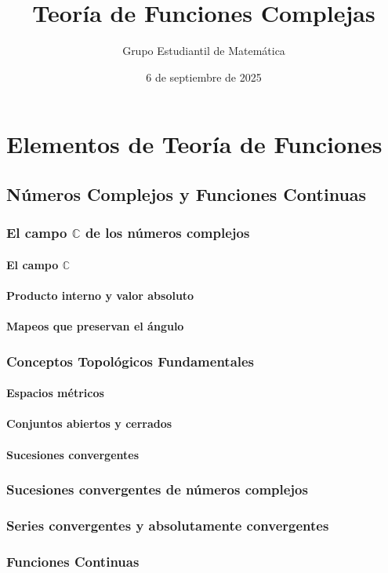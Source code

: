 \documentclass{report}
\title{Teoría de Funciones Complejas}
\author{Grupo Estudiantil de Matemática}
\date{6 de septiembre de 2025}
\begin{document}
\part{Elementos de Teoría de Funciones}
\chapter{Números Complejos y Funciones Continuas}
\section{El campo $\mathbb{C}$ de los números complejos}
\subsection{El campo $\mathbb{C}$}
\subsection{Producto interno y valor absoluto}
\subsection{Mapeos que preservan el ángulo}
\section{Conceptos Topológicos Fundamentales}
\subsection{Espacios métricos}
\subsection{Conjuntos abiertos y cerrados}
\subsection{Sucesiones convergentes}
\section{Sucesiones convergentes de números complejos}
\section{Series convergentes y absolutamente convergentes}
\section{Funciones Continuas}
\end{document}
